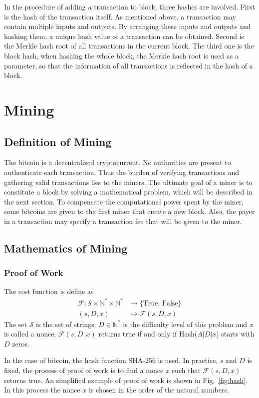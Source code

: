 \documentclass[12pt,a4paper]{article}
\begin{document}
In the procedure of adding a transaction to block, three hashes are involved. First is the hash of the transaction itself. As mentioned above, a transaction may contain multiple inputs and outputs. By arranging these inputs and outputs and hashing them, a unique hash value of a transaction can be obtained. 
Second is the Merkle hash root of all transactions in the current block. 
The third one is the block hash, when hashing the whole block, the Merkle hash root is used as a parameter, so that the information of all transactions is reflected in the hash of a block.

\section{Mining}
\label{sec:mining}
\subsection{Definition of Mining}
The bitcoin is a decentralized cryptocurrent. No authorities are present to authenticate each transaction. Thus the burden of verifying transactions and gathering valid transactions lies to the miners. The ultimate goal of a miner is to constitute a block by solving a mathematical problem, which will be described in the next section. To compensate the computational power spent by the miner, some bitcoins are given to the first miner that create a new block. Also, the payer in a transaction may specify a transaction fee that will be given to the miner. 
\subsection{Mathematics of Mining}
\subsubsection{Proof of Work}
The cost function is define as 
\begin{align*}
\mathcal{F}: \mathcal{S}\times \mathbb{N}^* \times \mathbb{N}^* &\longrightarrow \{\text{True, False}\}\\
(s, D, x)&\longmapsto \mathcal{F}(s, D, x)
\end{align*}
The set $\mathcal{S}$ is the set of strings. $D \in \mathbb{N}^*$ is the difficulty level of this problem and $x$ is called a nonce. $\mathcal{F}(s, D, x)$ returns true if and only if Hash($A|D|x$) starts with $D$ zeros. 


In the case of bitcoin, the hash function SHA-256 is used. In practice, $s$ and $D$ is fixed, the process of proof of work is to find a nonce $x$ such that $\mathcal{F}(s, D, x)$ returns true. An  simplified example of proof of work is shown in Fig.~\ref{fig:hash}. In this process the nonce $x$ is chosen in the order of the natural numbers.
\end{document}
